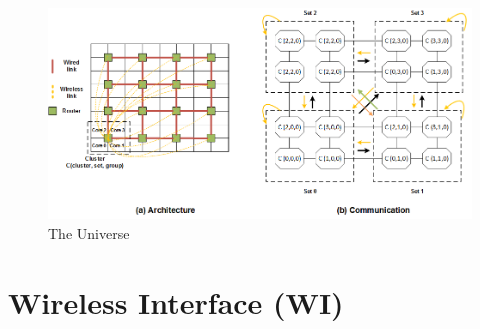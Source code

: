 \documentclass[12pt]{article}
\begin{document}
\begin{figure}[ht!]
\centering
\includegraphics[scale=0.5]{Fig_6041529.png}
\caption{The Universe}
\label{fig:Fig_6041529}
\end{figure}



\section{Wireless Interface (WI)}
\end{document}

